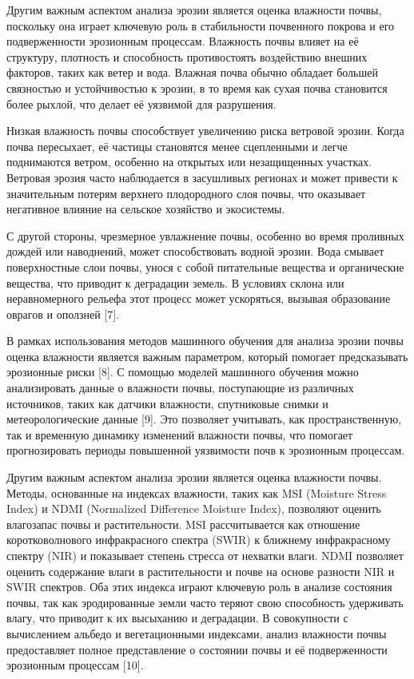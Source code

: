 \begin{multicols}{2}
Другим важным аспектом анализа эрозии является оценка влажности почвы,
поскольку она играет ключевую роль в стабильности почвенного покрова и
его подверженности эрозионным процессам. Влажность почвы влияет на её
структуру, плотность и способность противостоять воздействию внешних
факторов, таких как ветер и вода. Влажная почва обычно обладает большей
связностью и устойчивостью к эрозии, в то время как сухая почва
становится более рыхлой, что делает её уязвимой для разрушения.

Низкая влажность почвы способствует увеличению риска ветровой эрозии.
Когда почва пересыхает, её частицы становятся менее сцепленными и легче
поднимаются ветром, особенно на открытых или незащищенных участках.
Ветровая эрозия часто наблюдается в засушливых регионах и может привести
к значительным потерям верхнего плодородного слоя почвы, что оказывает
негативное влияние на сельское хозяйство и экосистемы.

С другой стороны, чрезмерное увлажнение почвы, особенно во время
проливных дождей или наводнений, может способствовать водной эрозии.
Вода смывает поверхностные слои почвы, унося с собой питательные
вещества и органические вещества, что приводит к деградации земель. В
условиях склона или неравномерного рельефа этот процесс может
ускоряться, вызывая образование оврагов и оползней {[}7{]}.

В рамках использования методов машинного обучения для анализа эрозии
почвы оценка влажности является важным параметром, который помогает
предсказывать эрозионные риски {[}8{]}. С помощью моделей машинного
обучения можно анализировать данные о влажности почвы, поступающие из
различных источников, таких как датчики влажности, спутниковые снимки и
метеорологические данные {[}9{]}. Это позволяет учитывать, как
пространственную, так и временную динамику изменений влажности почвы,
что помогает прогнозировать периоды повышенной уязвимости почв к
эрозионным процессам.

Другим важным аспектом анализа эрозии является оценка влажности
почвы. Методы, основанные на индексах влажности, таких как MSI
(Moisture Stress Index) и NDMI (Normalized Difference Moisture Index),
позволяют оценить влагозапас почвы и растительности. MSI рассчитывается
как отношение коротковолнового инфракрасного спектра (SWIR) к ближнему
инфракрасному спектру (NIR) и показывает степень стресса от нехватки
влаги. NDMI позволяет оценить содержание влаги в растительности и почве
на основе разности NIR и SWIR спектров. Оба этих индекса играют ключевую
роль в анализе состояния почвы, так как эродированные земли часто теряют
свою способность удерживать влагу, что приводит к их высыханию и
деградации. В совокупности с вычислением альбедо и вегетационными
индексами, анализ влажности почвы предоставляет полное представление о
состоянии почвы и её подверженности эрозионным процессам {[}10{]}.


\end{multicols}
